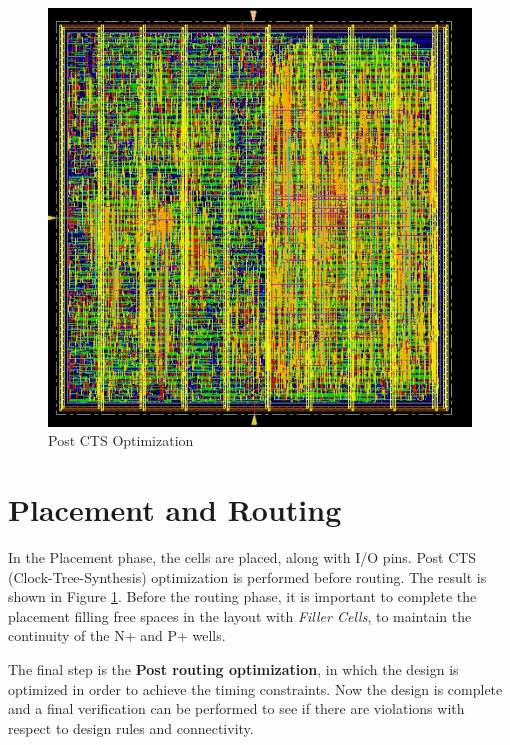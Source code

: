 \begin{figure}[ht]
	\centering
	\includegraphics[width=\textwidth]{chapters/figures/7.Post_CTS_optimization.jpg} 
	\caption{Post CTS Optimization}
	\label{fig:CTS_OPT}  %
	\end{figure}

\section{Placement and Routing}
In the Placement phase, the cells are placed, along with I/O pins. Post CTS (Clock-Tree-Synthesis) optimization is performed before routing.
The result is shown in Figure \ref{fig:CTS_OPT}.
Before the routing phase, it is important to complete the placement filling free spaces in the layout with \textit{Filler Cells}, to maintain the continuity of the N+ and P+ wells.

The final step is the \textbf{Post routing optimization}, in which the design is optimized in order to achieve the timing constraints.
Now the design is complete and a final verification can be performed to see if there are violations with respect to design rules and connectivity.

